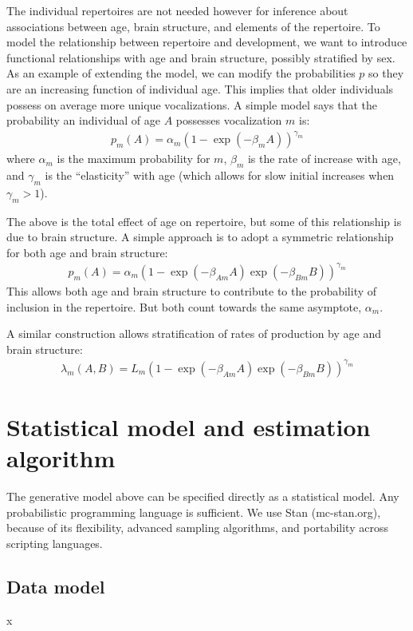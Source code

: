 \documentclass[reqno ,11pt]{amsart}
\begin{document}
The individual repertoires are not needed however for inference about associations between age, brain structure, and elements of the repertoire. 
To model the relationship between repertoire and development, we want to introduce functional relationships with age and brain structure, possibly stratified by sex. 
As an example of extending the model, we can modify the probabilities $p$ so they are an increasing function of individual age. This implies that older individuals possess on average more unique vocalizations. A simple model says that the probability an individual of age $A$ possesses vocalization $m$ is:
\begin{align*}
	p_m(A) = \alpha_m ( 1 - \exp(-\beta_m A) ) ^{\gamma_m}
\end{align*}
where $\alpha_m$ is the maximum probability for $m$, $\beta_m$ is the rate of increase with age, and $\gamma_m$ is the ``elasticity'' with age (which allows for slow initial increases when $\gamma_m > 1$).

The above is the total effect of age on repertoire, but some of this relationship is due to brain structure. A simple approach is to adopt a symmetric relationship for both age and brain structure:
\begin{align*}
	p_m(A) = \alpha_m ( 1 - \exp(-\beta_{Am} A)\exp(-\beta_{Bm} B) ) ^{\gamma_m}
\end{align*}
This allows both age and brain structure to contribute to the probability of inclusion in the repertoire. But both count towards the same asymptote, $\alpha_m$.

A similar construction allows stratification of rates of production by age and brain structure:
\begin{align*}
	\lambda_m(A,B) = L_m ( 1 - \exp(-\beta_{Am} A)\exp(-\beta_{Bm} B) ) ^{\gamma_m}
\end{align*}


\section{Statistical model and estimation algorithm}

The generative model above can be specified directly as a statistical model. Any probabilistic programming language is sufficient. We use Stan (mc-stan.org), because of its flexibility, advanced sampling algorithms, and portability across scripting languages.

\subsection{Data model}
x
\end{document}
